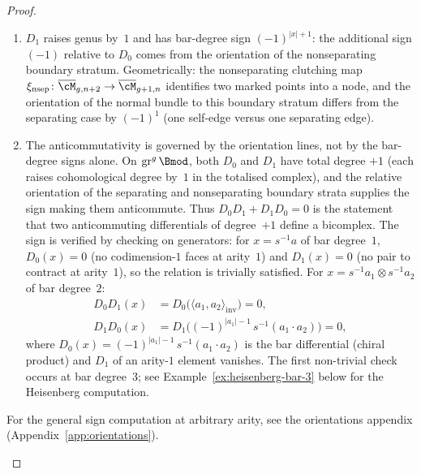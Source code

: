\begin{proof}
\begin{remark}
\begin{enumerate}[label=\textup{(\roman*)}]
\item $D_1$ raises genus by~$1$ and has bar-degree sign
 $(-1)^{|x|+1}$: the additional sign $(-1)$ relative to $D_0$
 comes from the orientation of the nonseparating boundary stratum.
 Geometrically: the nonseparating clutching map
 $\xi_{\mathrm{nsep}}\colon \Mbar_{g,n+2} \to
 \Mbar_{g+1,n}$ identifies two marked points into a node, and
 the orientation of the normal bundle to this boundary stratum
 differs from the separating case by $(-1)^1$
 (one self-edge versus one separating edge).

\item The anticommutativity is governed by the orientation
 lines, not by the bar-degree signs alone. On
 $\mathrm{gr}^g\,\Bmod$, both $D_0$ and $D_1$ have total
 degree $+1$ (each raises cohomological degree by~$1$ in the
 totalised complex), and the relative orientation of the
 separating and nonseparating boundary strata supplies the
 sign making them anticommute. Thus $D_0 D_1 + D_1 D_0 = 0$
 is the statement that two anticommuting differentials of
 degree~$+1$ define a bicomplex. The sign is verified by
 checking on generators: for $x = s^{-1}a$ of bar degree~$1$,
 $D_0(x) = 0$ (no codimension-$1$ faces at arity~$1$) and
 $D_1(x) = 0$ (no pair to contract at arity~$1$), so the
 relation is trivially satisfied. For $x = s^{-1}a_1 \otimes
 s^{-1}a_2$ of bar degree~$2$:
 \begin{align*}
 D_0 D_1(x) &= D_0\bigl(\langle a_1, a_2\rangle_{\mathrm{inv}}\bigr)
 = 0, \\
 D_1 D_0(x) &= D_1\bigl((-1)^{|a_1|-1}\, s^{-1}(a_1 \cdot a_2)\bigr)
 = 0,
 \end{align*}
 where $D_0(x) = (-1)^{|a_1|-1}\,s^{-1}(a_1 \cdot a_2)$ is the
 bar differential (chiral product) and $D_1$ of an arity-$1$ element
 vanishes. The first non-trivial check occurs at bar degree~$3$;
 see Example~\ref{ex:heisenberg-bar-3} below for the Heisenberg
 computation.
\end{enumerate}
For the general sign computation at arbitrary arity, see the
orientations appendix (Appendix~\ref{app:orientations}).
\end{remark}


\end{proof}
